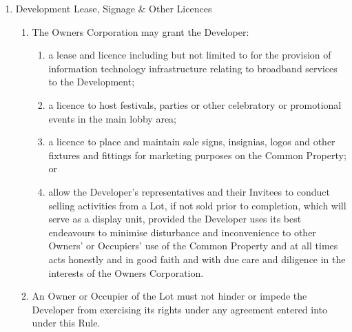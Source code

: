 \documentclass{article}
\begin{document}
\begin{enumerate}[label=\arabic*.]
\begin{enumerate}[label=\arabic{enumi}.\arabic*.]
\begin{enumerate}[label=(\arabic*)]
\begin{enumerate}[label=(\alph*)]
(iv) repairs any damage to the Common Property caused by the Developer.

\end{enumerate}

\item  An Owner or Occupier of a Lot must not hinder or impede the Developer from exercising their rights under any agreement entered into under this Rule.

\end{enumerate}

\item  Development Lease, Signage \& Other Licences

\begin{enumerate}[label=(\arabic*)]

\item  The Owners Corporation may grant the Developer:

\begin{enumerate}[label=(\alph*)]

\item  a lease and licence including but not limited to for the provision of information technology infrastructure relating to broadband services to the Development;

\item  a licence to host festivals, parties or other celebratory or promotional events in the main lobby area;

\item  a licence to place and maintain sale signs, insignias, logos and other fixtures and fittings for marketing purposes on the Common Property; or
\newpage



\item  allow the Developer's representatives and their Invitees to conduct selling activities from a Lot, if not sold prior to completion, which will serve as a display unit, provided the Developer uses its best endeavours to minimise disturbance and inconvenience to other Owners' or Occupiers' use of the Common Property and at all times acts honestly and in good faith and with due care and diligence in the interests of the Owners Corporation.

\end{enumerate}

\item  An Owner or Occupier of the Lot must not hinder or impede the Developer from exercising its rights under any agreement entered into under this Rule.


\end{enumerate}
\end{enumerate}
\end{enumerate}
\end{document}
